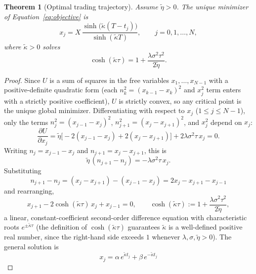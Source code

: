 \documentclass[11pt]{article}
\newtheorem{theorem}{Theorem}
\theoremstyle{remark}
\theoremstyle{definition}
\begin{document}
\begin{theorem}[Optimal trading trajectory]
\label{thm:trajectory}
Assume $\tilde\eta>0$. The unique minimizer of Equation~\eqref{eq:objective} is
\begin{equation}
x_j = X\,\frac{\sinh\big(\tilde\kappa(T-t_j)\big)}{\sinh(\tilde\kappa T)}, \qquad j=0,1,\ldots,N,
\label{eq:trajectory}
\end{equation}
where $\tilde\kappa>0$ solves
\begin{equation}
\cosh(\tilde\kappa\tau) = 1+\frac{\lambda\sigma^2\tau^2}{2\tilde\eta}.
\label{eq:kappadef}
\end{equation}
\end{theorem}
\begin{proof}
Since $U$ is a sum of squares in the free variables $x_1,\ldots,x_{N-1}$ with a positive-definite quadratic form (each $n_k^2=(x_{k-1}-x_k)^2$ and $x_j^2$ term enters with a strictly positive coefficient), $U$ is strictly convex, so any critical point is the unique global minimizer. Differentiating with respect to $x_j$ ($1\le j\le N-1$), only the terms $n_j^2=(x_{j-1}-x_j)^2$, $n_{j+1}^2=(x_j-x_{j+1})^2$, and $x_j^2$ depend on $x_j$:
\begin{equation*}
\frac{\partial U}{\partial x_j} = \tilde\eta\Big[-2(x_{j-1}-x_j)+2(x_j-x_{j+1})\Big] + 2\lambda\sigma^2\tau\,x_j = 0.
\end{equation*}
Writing $n_j=x_{j-1}-x_j$ and $n_{j+1}=x_j-x_{j+1}$, this is
\begin{equation*}
\tilde\eta\,(n_{j+1}-n_j) = -\lambda\sigma^2\tau\,x_j.
\end{equation*}
Substituting
\begin{equation*}
n_{j+1}-n_j = (x_j-x_{j+1})-(x_{j-1}-x_j) = 2x_j-x_{j+1}-x_{j-1}
\end{equation*}
and rearranging,
\begin{equation}
x_{j+1} - 2\cosh(\tilde\kappa\tau)\,x_j + x_{j-1} = 0, \qquad \cosh(\tilde\kappa\tau) := 1+\frac{\lambda\sigma^2\tau^2}{2\tilde\eta},
\label{eq:diffeq}
\end{equation}
a linear, constant-coefficient second-order difference equation with characteristic roots $e^{\pm\tilde\kappa\tau}$ (the definition of $\cosh(\tilde\kappa\tau)$ guarantees $\tilde\kappa$ is a well-defined positive real number, since the right-hand side exceeds $1$ whenever $\lambda,\sigma,\tilde\eta>0$). The general solution is
\begin{equation*}
x_j = \alpha\, e^{\tilde\kappa t_j}+\beta\, e^{-\tilde\kappa t_j}
\end{equation*}

\end{proof}
\end{document}
